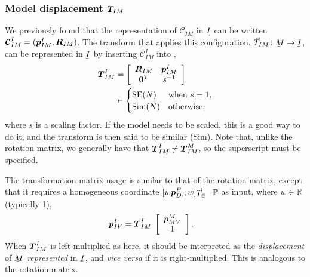 \subsubsection{Model displacement $\boldsymbol{T}_{\!IM}$}

We previously found that the representation of $\mathcal{C}_{IM}$ in $\uvec{I}$ can be written $\boldsymbol{\mathcal{C}}_{IM}^I = (\boldsymbol{p}_{IM}^I,\boldsymbol{R}_{IM})$. The transform that applies this configuration, $\vec{T}_{IM}\colon \ubar{M}\to\ubar{I}$, can be represented in $\ubar{I}$ by inserting $\boldsymbol{\mathcal{C}}_{IM}^I$ into ,
%
\begin{align}
\dvec{T}_{IM}^I &= 
\left[\begin{array}{c c}
 \mat{R}_{IM}  & \dvec{p}_{IM}^I \\%
 \dvec{0}^T  &  s^{-1}
\end{array}\right] \nn &\in
\begin{cases}
\mathrm{SE}(N) & \mathrm{when}\ s=1,\\
\mathrm{Sim}(N) & \mathrm{otherwise},
\end{cases} \label{eq_homogeneous_transformation}
\end{align}
%
where $s$ is a scaling factor. If the model needs to be scaled, this is a good way to do it, and the transform is then said to be similar (Sim). Note that, unlike the rotation matrix, we generally have that $\boldsymbol{T}_{IM}^I \ne \boldsymbol{T}_{IM}^M$, so the superscript must be specified.

The transformation matrix usage is similar to that of the rotation matrix, except that it requires a homogeneous coordinate $[w\dvec{p}_{D\cdot}^E;w]\T\in\mathbb{P}$ as input, where $w\in\mathbb{R}$ (typically 1),
%
\begin{align}
\boldsymbol{p}_{IV}^I &= \boldsymbol{T}_{IM}^I\; 
\left[\begin{array}{c}\boldsymbol{p}_{MV}^M \\ 1
\end{array}\right].
\end{align}
%
When $\boldsymbol{T}_{IM}^I$ is left-multiplied as here, it should be interpreted as the \emph{displacement} of $\ubar{M}$ \emph{represented} in $\ubar{I}$, and \emph{vice versa} if it is right-multiplied. This is analogous to the rotation matrix. 




